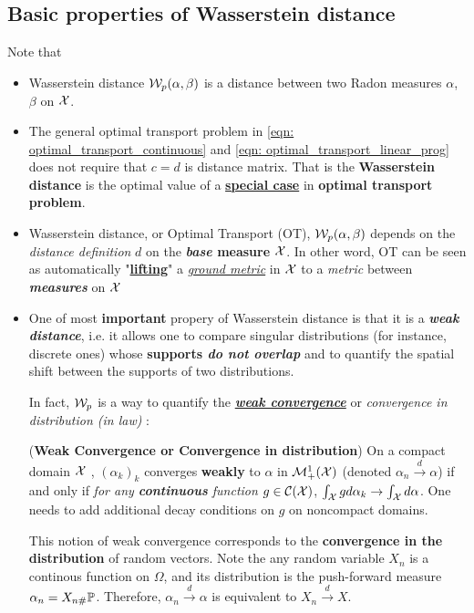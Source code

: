 \documentclass[11pt]{article}
\begin{document}
\subsection{Basic properties of Wasserstein distance}
Note that 
\begin{itemize}
\item Wasserstein distance ${\mathcal W}_{p}(\alpha, \beta)$ is a distance between two Radon measures $\alpha$, $\beta$ on ${\mathcal X}$. 
\item The general optimal transport problem in \eqref{eqn: optimal_transport_continuous} and \eqref{eqn: optimal_transport_linear_prog} does not require that $c=d$ is distance matrix. That is the \textbf{Wasserstein distance} is the optimal value of a \underline{\textbf{special case}} in \textbf{optimal transport problem}. 
\item Wasserstein distance, or Optimal Transport (OT), ${\mathcal W}_{p}(\alpha, \beta)$ depends on the \emph{distance definition} $d$ on the \textbf{\emph{base} measure} ${\mathcal X}$. In other word, OT can be seen as automatically "\underline{\textbf{lifting}}" a \underline{\emph{ground metric}} in ${\mathcal X}$ to a \emph{metric} between \textbf{\emph{measures}} on ${\mathcal X}$

\item One of most \textbf{important} propery of Wasserstein distance is that  it is a \emph{\textbf{weak distance}}, i.e. it allows one to compare singular distributions (for instance, discrete ones) whose \textbf{supports \emph{do not overlap}} and to quantify the spatial shift between the supports of two distributions. 

In fact, ${\mathcal W}_{p}$ is a way to quantify the \underline{\emph{\textbf{weak convergence}}} or \emph{convergence in distribution (in law)} \citep{villani2009optimal}: 
\begin{definition} (\textbf{Weak Convergence or Convergence in distribution})
On a compact domain ${\mathcal X}$ , $(\alpha_k)_k$ converges \textbf{weakly} to $\alpha$ in ${\mathcal M}_{+}^{1}({\mathcal X})$ (denoted $\alpha_{n}\stackrel{d}{\rightarrow} \alpha$) if and only if \emph{for any \textbf{continuous} function} $g \in {\mathcal C}({\mathcal X})$, $\int_{{\mathcal X}} g d\alpha_k \rightarrow \int_{{\mathcal X}} d\alpha$. One needs to add additional decay conditions on $g$ on noncompact domains. 

This notion of weak convergence corresponds to the \textbf{convergence in the distribution} of random vectors. Note the any random variable $X_{n}$ is a continous function on $\Omega$, and its distribution is the push-forward measure $\alpha_{n} = X_{n\#}{\mathbb P}$. Therefore, $\alpha_{n}\stackrel{d}{\rightarrow} \alpha$  is equivalent to $X_{n}\stackrel{d}{\rightarrow} X$.


\end{definition}
\end{itemize}
\end{document}
